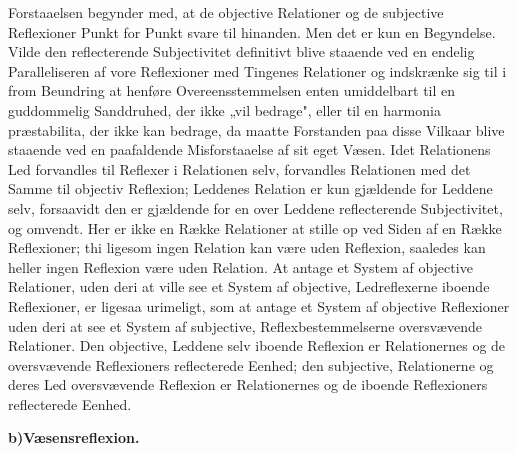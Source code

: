 \documentclass[12pt]{book}
\newcommand{\opage}[1]{\marginnote{\footnotesize\textit{[#1]}}}
\begin{document}
Forstaaelsen begynder med, at de objective Relationer og de subjective Reflexioner
Punkt for Punkt svare til hinanden. Men det er kun en Begyndelse. Vilde den
reflecterende Subjectivitet definitivt blive staaende ved en endelig Paralleliseren
af vore Reflexioner med Tingenes Relationer og indskrænke sig til i from Beundring at
henføre Overeensstemmelsen enten umiddelbart til en guddommelig Sanddruhed, der ikke
„vil bedrage", eller til en harmonia præstabilita, der ikke kan bedrage, da maatte
Forstanden paa disse Vilkaar blive staaende ved en paafaldende Misforstaaelse af sit
eget Væsen. Idet Relationens Led forvandles til Reflexer i Relationen selv,
forvandles Relationen med det Samme til objectiv Reflexion; Leddenes Relation er kun
gjældende for Leddene selv, forsaavidt den er gjældende for en over Leddene
reflecterende Subjectivitet, og omvendt. Her er ikke en Række Relationer at stille op
ved Siden af en Række Reflexioner; thi ligesom ingen Relation kan være uden
Reflexion, saaledes kan heller ingen Reflexion være uden Relation. At antage et
System af objective Relationer, uden deri at ville see et System af objective,
Ledreflexerne iboende Reflexioner, er ligesaa urimeligt, som at antage et System af
objective Reflexioner uden deri at see et System af subjective, Reflexbestemmelserne
\opage{76} oversvævende Relationer. Den objective, Leddene selv iboende Reflexion er
Relationernes og de oversvævende Reflexioners reflecterede Eenhed; den subjective,
Relationerne og deres Led oversvævende Reflexion er Relationernes og de iboende
Reflexioners reflecterede Eenhed.

\begin{center}{\bfseries b)\quad Væsensreflexion.}\end{center}
\end{document}
